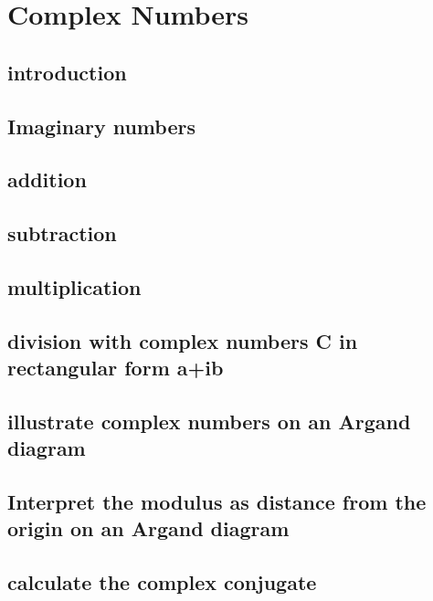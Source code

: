 \chapter{Complex Numbers}
\section{introduction}


\section{Imaginary numbers}


\section{addition}

\section{subtraction}


\section{multiplication}



\section{division with complex numbers C in
rectangular form a+ib}



\section{illustrate complex numbers on an
Argand diagram}



\section{Interpret the modulus as distance from
the origin on an Argand diagram}


\section{calculate the complex conjugate}

